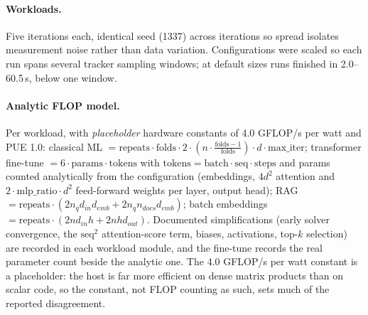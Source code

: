 \documentclass{article}
\begin{document}
\paragraph{Workloads.} Five iterations each, identical seed (1337) across
iterations so spread isolates measurement noise rather than data variation.
Configurations were scaled so each run spans several tracker sampling windows;
at default sizes runs finished in 2.0--60.5\,s, below one window.

\begin{center}
\footnotesize
{}
\end{center}

\paragraph{Analytic FLOP model.} Per workload, with \emph{placeholder}
hardware constants of 4.0 GFLOP/s per watt and PUE 1.0:
classical ML $= \text{repeats} \cdot \text{folds} \cdot 2 \cdot (n \cdot
\frac{\text{folds}-1}{\text{folds}}) \cdot d \cdot \text{max\_iter}$;
transformer fine-tune $= 6 \cdot \text{params} \cdot \text{tokens}$ with
$\text{tokens} = \text{batch} \cdot \text{seq} \cdot \text{steps}$ and params
counted analytically from the configuration (embeddings, $4d^2$ attention and
$2 \cdot \text{mlp\_ratio} \cdot d^2$ feed-forward weights per layer, output
head);
RAG $= \text{repeats} \cdot (2 n_q d_{in} d_{emb} + 2 n_q n_{docs} d_{emb})$;
batch embeddings $= \text{repeats} \cdot (2 n d_{in} h + 2 n h d_{out})$.
Documented simplifications (early solver convergence, the $\text{seq}^2$
attention-score term, biases, activations, top-$k$ selection) are recorded in
each workload module, and the fine-tune records the real parameter count
beside the analytic one. The 4.0 GFLOP/s per watt constant is a placeholder:
the host is far more efficient on dense matrix products than on scalar code,
so the constant, not FLOP counting as such, sets much of the reported
disagreement.
\end{document}

